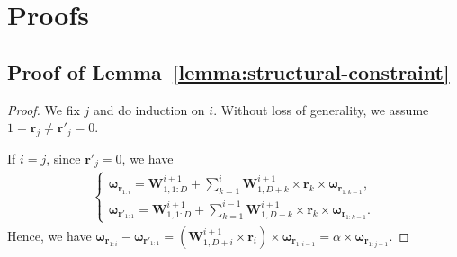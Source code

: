 \documentclass{article} \usepackage{iclr2020_conference,times}
\def\vr{{\bm{r}}}
\def\vomega{{\bm{\omega}}}
\def\mW{{\bm{W}}}
\begin{document}



\newpage

\appendix
\section{Proofs}
\subsection{Proof of Lemma~\ref{lemma:structural-constraint}}
\label{appendix:proof:structural-constraint}
\begin{proof}
We fix $j$ and do induction on $i$. Without loss of generality, we assume $1 = \vr_j \neq \vr'_j = 0$.

If $i=j$, since $\vr'_j = 0$, we have
\begin{align*}
\begin{cases}
    \vomega_{\vr_{1:i}} = \mW^{i+1}_{1, 1:D} + \sum_{k=1}^{i} \mW^{i+1}_{1, D+k} \times \vr_{k} \times \vomega_{\vr_{1:k-1}},\\
    \vomega_{\vr'_{1:1}} = \mW^{i+1}_{1, 1:D} + \sum_{k=1}^{i-1} \mW^{i+1}_{1, D+k} \times \vr_{k} \times \vomega_{\vr_{1:k-1}}.
    \end{cases}
\end{align*}
Hence, we have $\vomega_{\vr_{1:i}} - \vomega_{\vr'_{1:1}} = (\mW^{i+1}_{1, D+i} \times \vr_{i})  \times \vomega_{\vr_{1:i-1}} = \alpha \times \vomega_{\vr_{1:j-1}}$. 


\end{proof}
\end{document}
